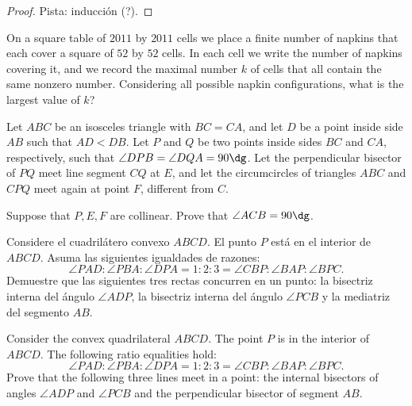 \begin{proof}
  Pista: inducción (?).
\end{proof}

\begin{probH}[ISL 2011/C7]
  On a square table of $2011$ by $2011$ cells we place a finite number of
  napkins that each cover a square of $52$ by $52$ cells. In each cell we write
  the number of napkins covering it, and we record the maximal number $k$ of
  cells that all contain the same nonzero number. Considering all possible
  napkin configurations, what is the largest value of $k$?
\end{probH}


\begin{probEG}[ISL 2020/G1]
  Let $ABC$ be an isosceles triangle with $BC=CA$, and let $D$ be a point inside
  side $AB$ such that $AD<DB$. Let $P$ and $Q$ be two points inside sides $BC$
  and $CA$, respectively, such that $\angle DPB=\angle DQA=90\dg$. Let the
  perpendicular bisector of $PQ$ meet line segment $CQ$ at $E$, and let the
  circumcircles of triangles $ABC$ and $CPQ$ meet again at point $F$, different
  from $C$.

  Suppose that $P,E,F$ are collinear. Prove that $\angle ACB=90\dg$.
\end{probEG}

\begin{probEG}
  Considere el cuadrilátero convexo $ABCD$. El punto $P$ está en el interior de
  $ABCD$. Asuma las siguientes igualdades de razones:
  \[\angle PAD:\angle PBA:\angle DPA=1:2:3=\angle CBP:\angle BAP:\angle BPC.\]
  Demuestre que las siguientes tres rectas concurren en un punto: la bisectriz
  interna del ángulo $\angle ADP$, la bisectriz interna del ángulo $\angle PCB$
  y la mediatriz del segmento $AB$.
  \begin{hint}
    Consider the convex quadrilateral $ABCD$. The point $P$ is in the interior
    of $ABCD$. The following ratio equalities hold:
    \[\angle PAD:\angle PBA:\angle DPA=1:2:3=\angle CBP:\angle BAP:\angle BPC.\]
    Prove that the following three lines meet in a point: the internal bisectors
    of angles $\angle ADP$ and $\angle PCB$ and the perpendicular bisector of
    segment $AB$.
  \end{hint}
\end{probEG}

